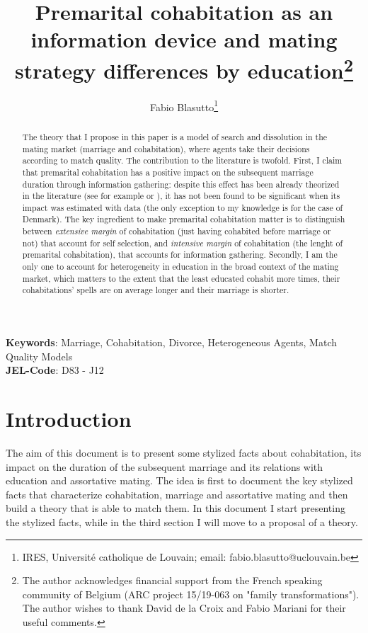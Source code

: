 \documentclass[12pt]{article}
\title{Premarital cohabitation as an information device and mating strategy differences by education\thanks{The author acknowledges financial support from the French speaking community of Belgium (ARC project 15/19-063 on "family transformations"). The author wishes to thank David de la Croix and Fabio Mariani for their useful comments.}}
\author{Fabio Blasutto\thanks{IRES, Université catholique de Louvain; email: fabio.blasutto@uclouvain.be}}
\begin{document}

	\maketitle
\begin{abstract}
The theory that I propose in this paper is a model of search and dissolution in the mating market (marriage and cohabitation), where agents take their decisions according to match quality. The contribution to the literature is twofold. First, I claim that premarital cohabitation has a positive impact on the subsequent marriage duration through information gathering: despite this effect has been already theorized in the literature (see for example  \citet{brien2006} or \citet{marinescu2016}), it has not been found to be significant when its impact was estimated with data (the only exception to my knowledge is  \citet{svarer2004} for the case of Denmark). The key ingredient to make premarital cohabitation matter is to distinguish between \textit{extensive margin} of cohabitation (just having cohabited before marriage or not) that account for self selection, and \textit{intensive margin} of cohabitation (the lenght of premarital cohabitation), that accounts for information gathering. Secondly, I am the only one to account for heterogeneity in education in the broad context of the mating market, which matters to the extent that the least educated cohabit more times, their cohabitations' spells are on average longer and their marriage is shorter.
\end{abstract}
\textbf{Keywords}: Marriage, Cohabitation, Divorce, Heterogeneous Agents, Match Quality Models\\
\textbf{JEL-Code}: D83 - J12 
\clearpage
\noindent \medskip{}
\section{Introduction}
The aim of this document is to present some stylized facts about cohabitation, its impact on the duration of the subsequent marriage and its relations with education and assortative mating. The idea is first to document the key stylized facts that characterize cohabitation, marriage and assortative mating and then build a theory that is able to match them. In this document I start presenting the stylized facts, while in the third section I will move to a proposal of a theory.
\end{document}
